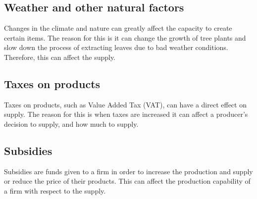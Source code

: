\documentclass[12pt]{report}
\begin{document}
\subsection{Weather and other natural factors}
Changes in the climate and nature can greatly affect the capacity to create certain items. The reason for this is it can change the growth of tree plants and slow down the process of extracting leaves due to bad weather conditions. Therefore, this can affect the supply.

\subsection{Taxes on products}
Taxes on products, such as Value Added Tax (VAT), can have a direct effect on supply. The reason for this is when taxes are increased it can affect a producer’s decision to supply, and how much to supply.

\subsection{Subsidies}
Subsidies are funds given to a firm in order to increase the production and supply or reduce the price of their products. This can affect the production capability of a firm with respect to the supply.
\end{document}
